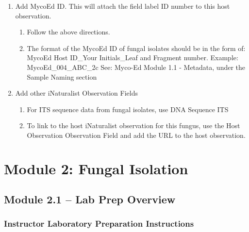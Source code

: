 \documentclass[
  letterpaper,
  DIV=11,
  numbers=noendperiod]{scrreprt}
\providecommand{\tightlist}{%
  \setlength{\itemsep}{0pt}\setlength{\parskip}{0pt}}
\begin{document}
\begin{enumerate}
\def\labelenumi{\arabic{enumi}.}
\setcounter{enumi}{14}
\tightlist
\item
  Add MycoEd ID. This will attach the field label ID number to this host
  observation.

  \begin{enumerate}
  \def\labelenumii{\alph{enumii}.}
  \tightlist
  \item
    Follow the above directions.
  \item
    The format of the MycoEd ID of fungal isolates should be in the form
    of: MycoEd Host ID\_Your Initials\_Leaf and Fragment number.
    Example: MycoEd\_004\_ABC\_2c See: Myco-Ed Module 1.1 - Metadata,
    under the Sample Naming section
  \end{enumerate}
\item
  Add other iNaturalist Observation Fields

  \begin{enumerate}
  \def\labelenumii{\alph{enumii}.}
  \tightlist
  \item
    For ITS sequence data from fungal isolates, use DNA Sequence ITS
  \item
    To link to the host iNaturalist observation for this fungus, use the
    Host Observation Observation Field and add the URL to the host
    observation.
  \end{enumerate}
\end{enumerate}


\chapter*{Module 2: Fungal Isolation}\label{module-2-fungal-isolation}


\section*{Module 2.1 -- Lab Prep
Overview}\label{module-2.1-lab-prep-overview}


\subsection*{Instructor Laboratory Preparation
Instructions}\label{instructor-laboratory-preparation-instructions-1}
\end{document}
